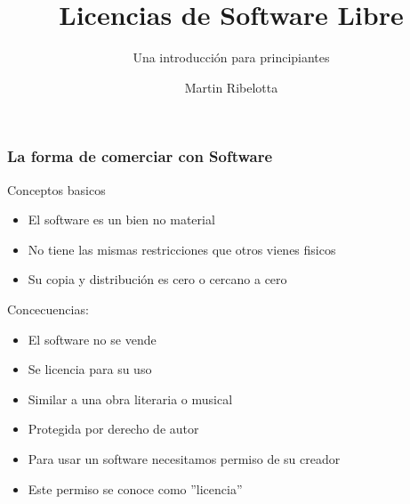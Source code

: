 \documentclass[11pt]{beamer}
\author{Martin Ribelotta}
\title{Licencias de Software Libre}
\subtitle{Una introducción para principiantes}
\begin{document}
\begin{frame}
\titlepage
\end{frame}

\begin{frame}
\frametitle{La forma de comerciar con Software}
\begin{block}{Conceptos basicos}
\begin{itemize}[<+-| alert@+>]
\item El software es un bien no material
\item No tiene las mismas restricciones que otros vienes fisicos
\item Su copia y distribución es cero o cercano a cero
\end{itemize}
\end{block}
\pause
\begin{exampleblock}{Concecuencias:}
\begin{itemize}[<+-| alert@+>]
\item El software no se vende
\item Se licencia para su uso
\item Similar a una obra literaria o musical
\item Protegida por derecho de autor
\item Para usar un software necesitamos permiso de su creador
\item Este permiso se conoce como ''licencia''
\end{itemize}
\end{exampleblock}
\end{frame}
\end{document}
